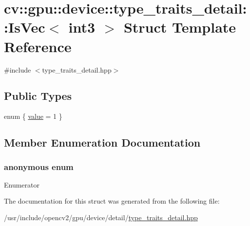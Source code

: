 \hypertarget{structcv_1_1gpu_1_1device_1_1type__traits__detail_1_1IsVec_3_01int3_01_4}{\section{cv\-:\-:gpu\-:\-:device\-:\-:type\-\_\-traits\-\_\-detail\-:\-:Is\-Vec$<$ int3 $>$ Struct Template Reference}
\label{structcv_1_1gpu_1_1device_1_1type__traits__detail_1_1IsVec_3_01int3_01_4}
}


{\ttfamily \#include $<$type\-\_\-traits\-\_\-detail.\-hpp$>$}

\subsection*{Public Types}
\begin{DoxyCompactItemize}
\item 
enum \{ \hyperlink{structcv_1_1gpu_1_1device_1_1type__traits__detail_1_1IsVec_3_01int3_01_4_a27a404b685540147f07c55d2d29bd5f9ab87cea4c8d1808575c62312f0f50edea}{value} = 1
 \}
\end{DoxyCompactItemize}


\subsection{Member Enumeration Documentation}
\hypertarget{structcv_1_1gpu_1_1device_1_1type__traits__detail_1_1IsVec_3_01int3_01_4_a27a404b685540147f07c55d2d29bd5f9}{\subsubsection[{anonymous enum}]{\setlength{\rightskip}{0pt plus 5cm}anonymous enum}}\label{structcv_1_1gpu_1_1device_1_1type__traits__detail_1_1IsVec_3_01int3_01_4_a27a404b685540147f07c55d2d29bd5f9}
\begin{Desc}
\item[Enumerator]\par
\begin{description}
\item[{\em 
\hypertarget{structcv_1_1gpu_1_1device_1_1type__traits__detail_1_1IsVec_3_01int3_01_4_a27a404b685540147f07c55d2d29bd5f9ab87cea4c8d1808575c62312f0f50edea}{value}\label{structcv_1_1gpu_1_1device_1_1type__traits__detail_1_1IsVec_3_01int3_01_4_a27a404b685540147f07c55d2d29bd5f9ab87cea4c8d1808575c62312f0f50edea}
}]\end{description}
\end{Desc}


The documentation for this struct was generated from the following file\-:\begin{DoxyCompactItemize}
\item 
/usr/include/opencv2/gpu/device/detail/\hyperlink{type__traits__detail_8hpp}{type\-\_\-traits\-\_\-detail.\-hpp}\end{DoxyCompactItemize}

